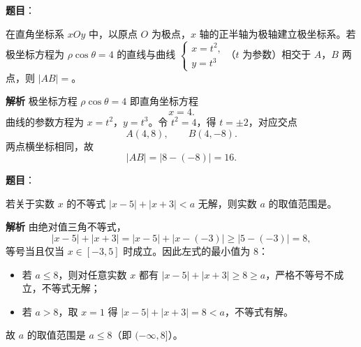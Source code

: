 \begin{answer}

\textbf{题目}：

在直角坐标系 $xOy$ 中，以原点 $O$ 为极点，$x$ 轴的正半轴为极轴建立极坐标系。若极坐标方程为 $\rho\cos\theta=4$ 的直线与曲线 $\begin{cases}x=t^2,\\y=t^3\end{cases}$（$t$ 为参数）相交于 $A$，$B$ 两点，则 $|AB|=$\gkblank{}。

\textbf{解析}
极坐标方程 $\rho\cos\theta=4$ 即直角坐标方程
\nopagebreak[4]
\[x=4.\]
曲线的参数方程为 $x=t^2$，$y=t^3$。令 $t^2=4$，得 $t=\pm2$，对应交点
\nopagebreak[4]
\[A(4,8),\qquad B(4,-8).\]
两点横坐标相同，故
\nopagebreak[4]
\[|AB|=|8-(-8)|=16.\]


\end{answer}
\begin{answer}

\textbf{题目}：

若关于实数 $x$ 的不等式 $|x-5|+|x+3|<a$ 无解，则实数 $a$ 的取值范围是\gkblank{}。

\textbf{解析}
由绝对值三角不等式，
\nopagebreak[4]
\[|x-5|+|x+3|=|x-5|+|x-(-3)|\geqslant|5-(-3)|=8,\]
等号当且仅当 $x\in[-3,5]$ 时成立。因此左式的最小值为 $8$：

\begin{itemize}
\item 若 $a\leqslant8$，则对任意实数 $x$ 都有 $|x-5|+|x+3|\geqslant8\geqslant a$，严格不等号不成立，不等式无解；
\item 若 $a>8$，取 $x=1$ 得 $|x-5|+|x+3|=8<a$，不等式有解。
\end{itemize}

故 $a$ 的取值范围是 $a\leqslant8$（即 $(-\infty,8]$）。


\end{answer}
